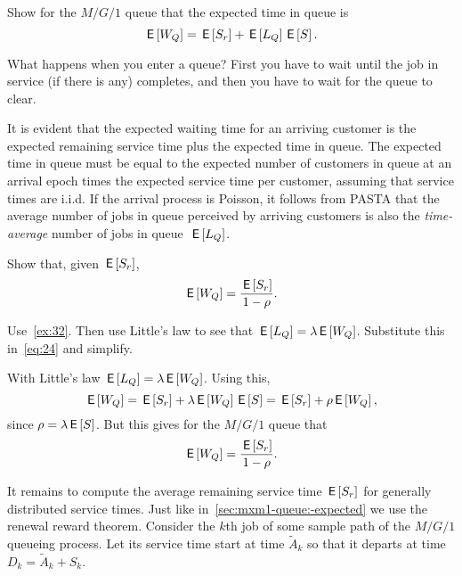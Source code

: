 \documentclass[companion]{subfiles}
\begin{document}
\begin{extra}
Show for the $M/G/1$ queue that the expected time in queue is
\begin{equation}\label{eq:24}
 \,\mathsf{E}\left[W_Q\right] = \,\mathsf{E}\left[S_r\right] + \,\mathsf{E}\left[L_Q\right] \,\mathsf{E}\left[S\right].
\end{equation}
\begin{hint}
 What happens when you enter a queue? First you have to wait until the job in service (if there is any) completes, and then you have to wait for the queue to clear.
\end{hint}
\begin{solution}
It is evident that the expected waiting time for an arriving customer is the expected
remaining service time plus the expected time in queue. The expected
time in queue must be equal to the expected number of
customers in queue at an arrival epoch times the expected service time
per customer, assuming that service times are i.i.d. If the arrival
process is Poisson, it follows from PASTA that the average number of
jobs in queue perceived by arriving customers is also the
\emph{time-average} number of jobs in queue~$\,\mathsf{E}\left[L_Q\right]$. 
\end{solution}
\end{extra}


\begin{exercise}
Show that, given $\,\mathsf{E}\left[S_r\right]$, 
\begin{equation}\label{eq:35}
 \E{W_Q} = \frac{\E{S_r}}{1-\rho}.%
\end{equation}
\begin{hint}
 Use~\cref{ex:32}. Then use Little's law to see that $\,\mathsf{E}\left[L_Q\right] = \lambda \,\mathsf{E}\left[W_Q\right]$. Substitute this in~\cref{eq:24} and simplify.
\end{hint}
\begin{solution}
With Little's law $\,\mathsf{E}\left[L_Q\right] = \lambda \,\mathsf{E}\left[W_Q\right]$. Using this,
\begin{equation*}
 \,\mathsf{E}\left[W_Q\right] = \,\mathsf{E}\left[S_r\right] + \lambda \,\mathsf{E}\left[W_Q\right] \,\mathsf{E}\left[S\right] =\,\mathsf{E}\left[S_r\right] + \rho \,\mathsf{E}\left[W_Q\right],
\end{equation*}
since $\rho=\lambda \,\mathsf{E}\left[S\right]$. But this gives for the $M/G/1$ queue that
\begin{equation*}
 \,\mathsf{E}\left[W_Q\right] = \frac{\,\mathsf{E}\left[S_r\right]}{1-\rho}.
\end{equation*}
\end{solution}
\end{exercise}



It remains to compute the average remaining service time $\,\mathsf{E}\left[S_r\right]$ for generally distributed service times.
Just like in~\cref{sec:mxm1-queue:-expected} we use the renewal reward theorem.
Consider the $k$th job of some sample path of the $M/G/1$ queueing process.
Let its service time start at time $\tilde A_k$ so that it departs at time $D_k=\tilde A_k + S_k$.
\end{document}
